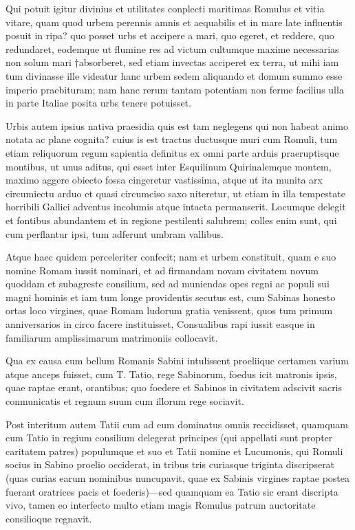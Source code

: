  Qui potuit igitur divinius et utilitates conplecti maritimas Romulus et vitia vitare, quam quod urbem perennis amnis et aequabilis et in mare late influentis posuit in ripa? quo posset urbs et accipere a mari, quo egeret, et reddere, quo redundaret, eodemque ut flumine res ad victum cultumque maxime necessarias non solum mari †absorberet, sed etiam invectas acciperet ex terra, ut mihi iam tum divinasse ille videatur hanc urbem sedem aliquando et domum summo esse imperio praebituram; nam hanc rerum tantam potentiam non ferme facilius ulla in parte Italiae posita urbs tenere potuisset.

 Urbis autem ipsius nativa praesidia quis est tam neglegens qui non habeat animo notata ac plane cognita? cuius is est tractus ductusque muri cum Romuli, tum etiam reliquorum regum sapientia definitus ex omni parte arduis praeruptisque montibus, ut unus aditus, qui esset inter Esquilinum Quirinalemque montem, maximo aggere obiecto fossa cingeretur vastissima, atque ut ita munita arx circumiectu arduo et quasi circumciso saxo niteretur, ut etiam in illa tempestate horribili Gallici adventus incolumis atque intacta permanserit. Locumque delegit et fontibus abundantem et in regione pestilenti salubrem; colles enim sunt, qui cum perflantur ipsi, tum adferunt umbram vallibus.

 Atque haec quidem perceleriter confecit; nam et urbem constituit, quam e suo nomine Romam iussit nominari, et ad firmandam novam civitatem novum quoddam et subagreste consilium, sed ad muniendas opes regni ac populi sui magni hominis et iam tum longe providentis secutus est, cum Sabinas honesto ortas loco virgines, quae Romam ludorum gratia venissent, quos tum primum anniversarios in circo facere instituisset, Consualibus rapi iussit easque in familiarum amplissimarum matrimoniis collocavit.

 Qua ex causa cum bellum Romanis Sabini intulissent proeliique certamen varium atque anceps fuisset, cum T. Tatio, rege Sabinorum, foedus icit matronis ipsis, quae raptae erant, orantibus; quo foedere et Sabinos in civitatem adscivit sacris conmunicatis et regnum suum cum illorum rege sociavit.

 Post interitum autem Tatii cum ad eum dominatus omnis reccidisset, quamquam cum Tatio in regium consilium delegerat principes (qui appellati sunt propter caritatem patres) populumque et suo et Tatii nomine et Lucumonis, qui Romuli socius in Sabino proelio occiderat, in tribus tris curiasque triginta discripserat (quas curias earum nominibus nuncupavit, quae ex Sabinis virgines raptae postea fuerant oratrices pacis et foederis)—sed quamquam ea Tatio sic erant discripta vivo, tamen eo interfecto multo etiam magis Romulus patrum auctoritate consilioque regnavit.

